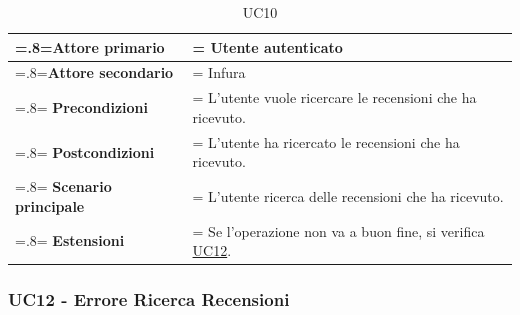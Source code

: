             \begin{table}[H]
                \centering
                \renewcommand{\arraystretch}{1.8}
                \renewcommand\tabularxcolumn[1]{m{#1}}
                \begin{tabularx}{0.9\textwidth} {
                    >{\hsize=.8\hsize\linewidth=\hsize}X
                    >{\hsize=1.2\hsize\linewidth=\hsize}X}
                    \hline
                    \textbf{Attore primario} & Utente autenticato \\
                    \hline
                    \textbf{Attore secondario} & Infura \\
                    \hline
                    \textbf{Precondizioni} & L'utente vuole ricercare le recensioni che ha ricevuto. \\
                    \hline
                    \textbf{Postcondizioni} & L'utente ha ricercato le recensioni che ha ricevuto. \\
                    \hline
                    \textbf{Scenario principale} & L'utente ricerca delle recensioni che ha ricevuto.\\
                    \hline
                    \textbf{Estensioni} & Se l'operazione non va a buon fine, si verifica \hyperref[UC12]{UC12}. \\
                    \hline
                \end{tabularx}
                \caption{UC10}
            \end{table}

        \subsubsection{UC12 - Errore Ricerca Recensioni}
        \label{UC12}

